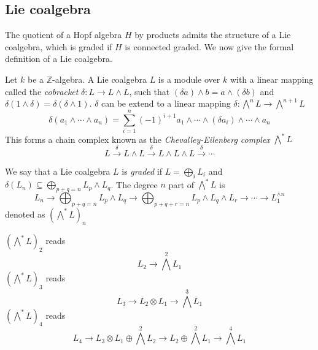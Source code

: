 \subsection{Lie coalgebra}

The quotient of a Hopf algebra $H$ by products admits the structure of a Lie coalgebra, which is graded if $H$ is connected graded. We now give the formal definition of a Lie coalgebra.

\begin{definition}\label{def: Lie coalgebra}
Let $k$ be a $\mathbb Z$-algebra. A Lie coalgebra $L$ is a module over $k$ with a linear mapping called the \textit{cobracket} $\delta:L\to L\wedge L$, such that $(\delta a)\wedge b=a\wedge(\delta b)$ and $\delta(1\wedge\delta)=\delta(\delta\wedge1)$. $\delta$ can be extend to a linear mapping $\delta:\bigwedge^nL\to\bigwedge^{n+1}L$
\begin{equation}
\delta(a_1\wedge\cdots\wedge a_n)=\sum_{i=1}^n(-1)^{i+1}a_1\wedge\cdots\wedge(\delta a_i)\wedge\cdots\wedge a_n
\end{equation}
This forms a chain complex known as the \textit{Chevalley-Eilenberg complex} $\bigwedge^*L$
\begin{equation}
L\xrightarrow{\delta}L\wedge L\xrightarrow{\delta}L\wedge L\wedge L\xrightarrow{\delta}\cdots
\end{equation}
\end{definition}

\begin{definition}\label{def: graded Lie coalgebra}
We say that a Lie coalgebra $L$ is \textit{graded} if $L=\bigoplus_iL_i$ and $\delta(L_n)\subseteq\bigoplus_{p+q=n}L_p\wedge L_q$. The degree $n$ part of $\bigwedge^* L$ is
\[
L_n\to \bigoplus_{p+q=n}L_p\wedge L_q\to \bigoplus_{p+q+r=n}L_p\wedge L_q\wedge L_r\to\cdots\to L_1^{\wedge n}
\]
denoted as $\left(\bigwedge^* L\right)_n$
\end{definition}

\begin{example}
$\left(\bigwedge^* L\right)_2$ reads
\[
L_2\to\textstyle\bigwedge^2L_1
\]
$\left(\bigwedge^* L\right)_3$ reads
\[
L_3\to L_2\otimes L_1\to\textstyle\bigwedge^3L_1
\]
$\left(\bigwedge^* L\right)_4$ reads
\[
L_4\to L_3\otimes L_1\oplus\textstyle\bigwedge^2L_2\to L_2\oplus\bigwedge^2L_1\to\bigwedge^4L_1
\]
\end{example}


